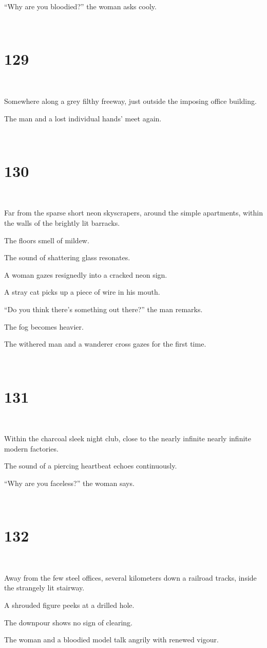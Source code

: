 \documentclass{report}
\begin{document}
``Why are you bloodied?'' the woman asks cooly.

~
\chapter*{129}
~

Somewhere along a grey filthy freeway, just outside the imposing office building.

The man and a lost individual hands' meet again.

~
\chapter*{130}
~

Far from the sparse short neon skyscrapers, around the simple apartments, within the walls of the brightly lit barracks.

The floors smell of mildew.

The sound of shattering glass resonates.

A woman gazes resignedly into a cracked neon sign.

A stray cat picks up a piece of wire in his mouth.

``Do you think there's something out there?'' the man remarks.

The fog becomes heavier.

The withered man and a wanderer cross gazes for the first time.

~
\chapter*{131}
~

Within the charcoal sleek night club, close to the nearly infinite nearly infinite modern factories.

The sound of a piercing heartbeat echoes continuously.

``Why are you faceless?'' the woman says.

~
\chapter*{132}
~

Away from the few steel offices, several kilometers down a railroad tracks, inside the strangely lit stairway.

A shrouded figure peeks at a drilled hole.

The downpour shows no sign of clearing.

The woman and a bloodied model talk angrily with renewed vigour.
\end{document}
